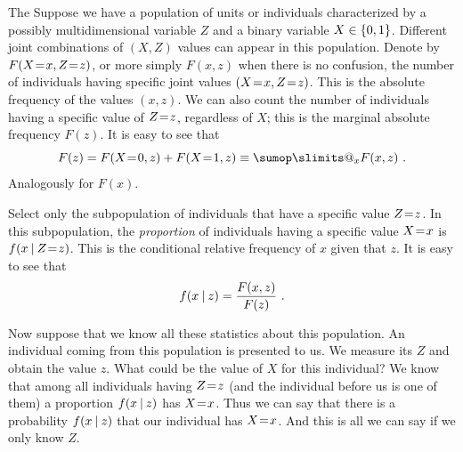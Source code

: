 \documentclass[\ifafour a4paper,12pt,\else a5paper,10pt,\fi%
onecolumn,oneside,article,%
british%
]{memoir}
\makeatletter
\theoremstyle{remark}
\theoremstyle{innote}
\def\sum{\DOTSI\sumop\slimits@}
\DeclarePairedDelimiter\set{\{}{\}} %
\renewcommand*{\|}[1][]{\nonscript\:#1\vert\nonscript\:\mathopen{}}
\newcommand*{\mo}[1][=]{\mathrel{\mkern-3.5mu#1\mkern-3.5mu}}
\makeatother
\begin{document}
The Suppose we have a population of units or individuals characterized by a possibly multidimensional variable $Z$ and a binary variable $X \in \set{0,1}$. Different joint combinations of $(X,Z)$ values can appear in this population. Denote by $F(X\mo x, Z\mo z)$, or more simply $F(x, z)$ when there is no confusion, the number of individuals having specific joint values $(X\mo x, Z\mo z)$. This is the absolute frequency of the values $(x,z)$. We can also count the number of individuals having a specific value of $Z\mo z$, regardless of $X$; this is the marginal absolute frequency $F(z)$. It is easy to see that
\begin{equation}
  \label{eq:marginal_prob}
  F(z) = F(X\mo 0, z) + F(X\mo 1, z) \equiv \sum_{x} F(x,z)\ .
\end{equation}
Analogously for $F(x)$.

Select only the subpopulation of individuals that have a specific value $Z\mo z$. In this subpopulation, the \emph{proportion} of individuals having a specific value $X\mo x$ is $f(x\| Z\mo z)$. This is the conditional relative frequency of $x$ given that $z$. It is easy to see that
\begin{equation}
  \label{eq:cond_prob}
  f(x \| z) = \frac{F(x,z)}{F(z)} \ .
\end{equation}

Now suppose that we know all these statistics about this population. An
individual coming from this population is presented to us. We measure its
$Z$ and obtain the value $z$. What could be the value of $X$ for this
individual? We know that among all individuals having $Z\mo z$ (and the
individual before us is one of them) a proportion $f(x \| z)$ has $X\mo x$.
Thus we can say that there is a probability $f(x \| z)$ that our individual
has $X\mo x$. And this is all we can say if we only know $Z$.

\medskip
\end{document}
